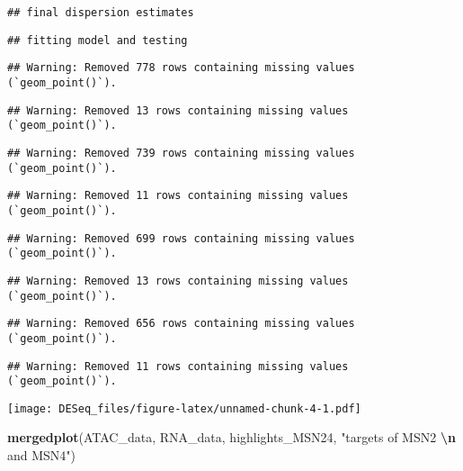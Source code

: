 \documentclass[
]{article}
\newenvironment{Shaded}{\begin{snugshade}}{\end{snugshade}}
\newcommand{\FunctionTok}[1]{\textcolor[rgb]{0.13,0.29,0.53}{\textbf{#1}}}
\newcommand{\NormalTok}[1]{#1}
\newcommand{\SpecialCharTok}[1]{\textcolor[rgb]{0.81,0.36,0.00}{\textbf{#1}}}
\newcommand{\StringTok}[1]{\textcolor[rgb]{0.31,0.60,0.02}{#1}}
\begin{document}
\begin{verbatim}
## final dispersion estimates
\end{verbatim}

\begin{verbatim}
## fitting model and testing
\end{verbatim}

\begin{verbatim}
## Warning: Removed 778 rows containing missing values (`geom_point()`).
\end{verbatim}

\begin{verbatim}
## Warning: Removed 13 rows containing missing values (`geom_point()`).
\end{verbatim}

\begin{verbatim}
## Warning: Removed 739 rows containing missing values (`geom_point()`).
\end{verbatim}

\begin{verbatim}
## Warning: Removed 11 rows containing missing values (`geom_point()`).
\end{verbatim}

\begin{verbatim}
## Warning: Removed 699 rows containing missing values (`geom_point()`).
\end{verbatim}

\begin{verbatim}
## Warning: Removed 13 rows containing missing values (`geom_point()`).
\end{verbatim}

\begin{verbatim}
## Warning: Removed 656 rows containing missing values (`geom_point()`).
\end{verbatim}

\begin{verbatim}
## Warning: Removed 11 rows containing missing values (`geom_point()`).
\end{verbatim}

\texttt{[image: DESeq\_files/figure-latex/unnamed-chunk-4-1.pdf]}

\begin{Shaded}
\begin{Highlighting}[]
\FunctionTok{mergedplot}\NormalTok{(ATAC\_data, RNA\_data, highlights\_MSN24, }\StringTok{"targets of MSN2 }\SpecialCharTok{\textbackslash{}n}\StringTok{ and MSN4"}\NormalTok{)}
\end{Highlighting}
\end{Shaded}
\end{document}
